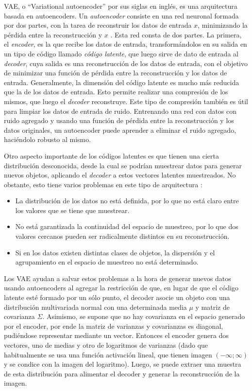 \documentclass[spanish]{article}
\begin{document}
VAE, o ``Variational autoencoder'' por sus siglas en inglés, es una
arquitectura basada en autoencoders. Un \textit{autoencoder} consiste
en una red neuronal formada por dos partes, con la tarea de reconstruir
los datos de entrada \(x\), minimizando la pérdida entre la
reconstrucción y \(x\) \cite{goodfellow2016deep}.
Esta red consta de dos partes. La primera, el \textit{encoder}, es la 
que recibe los datos de entrada, transformándolos en su salida en un 
tipo de código llamado \textit{código latente}, que luego sirve de
dato de entrada al \textit{decoder}, cuya salida es una reconstrucción
de los datos de entrada, con el objetivo de minimizar una función de
pérdida entre la reconstrucción y los datos de entrada.
Generalmente, la dimensión del código latente es mucho más reducida que
la de los datos de entrada. Esto permite realizar una compresión de los
mismos, que luego el \textit{decoder} reconstruye. Este tipo de
compresión también es útil para limpiar los datos de entrada de ruido.
Entrenando una red con datos con ruido agregado y usando una función de
pérdida entre la reconstrucción y los datos originales, un autoencoder
puede aprender a eliminar el ruido agregado, haciéndolo robusto al
mismo.

Otro aspecto importante de los códigos latentes es que tienen una
cierta distribución desconocida, desde la cual se podrían muestrear
datos para generar nuevos objetos, aplicando el \textit{decoder} a
estos vectores latentes muestreados. No obstante, esto tiene varios
problemas en este tipo de arquitectura \cite{Foster2019}:

\begin{itemize}
    \item La distribución de los datos no está definida, por lo que no
        está claro entre los valores que se tiene que muestrear.
    \item No está garantizada la continuidad del espacio de muestreo,
        por lo que dos valores cercanos pueden ser radicalmente
        distintos en su reconstrucción.
    \item Si en los datos existen distintas clases de objetos, la
        dispersión y el agrupamiento en el espacio de muestreo no está
        determinado.
\end{itemize}

Los VAE ayudan a salvar estos problemas a la hora de generar nuevos
datos usando autoencoders al agregar la restricción de que, en lugar
de que el código latente esté formado por un sólo punto, el decoder
asocie un objeto con una distribución multivariada normal con una
determinada media \(\mu\) y matriz de covarianza \(\Sigma\). Asimismo,
se supone que no hay covarianza en el espacio generado por el encoder,
por ende la matriz de varianzas y covarianzas es diagonal, pudiéndose
representar mediante un vector. Entonces el encoder genera dos vectores,
uno de medias y otro de logaritmos de varianzas (dado que habitualmente
se usa una función activación lineal, que tienen imagen
\((-\infty;\infty)\) y se condice con la imagen del logaritmo). Luego,
se puede extraer una muestra de esta distribución para alimentar el
decoder y generar la reconstrucción de la imagen.
\end{document}
